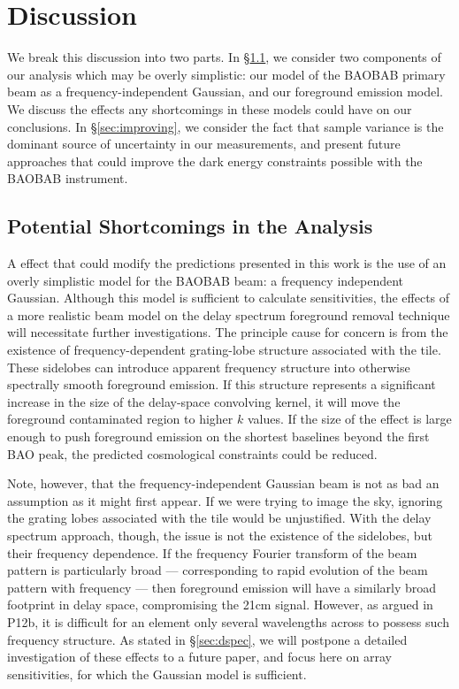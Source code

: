 \documentclass[10pt,iop]{emulateapj}
\begin{document}
\section{Discussion}
\label{sec:discussion}

We break this discussion into two parts.  In \S\ref{sec:shortcomings}, we consider two 
components of our analysis which may be overly simplistic: our model of the BAOBAB primary
beam as a frequency-independent Gaussian, and our foreground emission model.  We discuss the effects 
any shortcomings in these models could have on our conclusions. In \S\ref{sec:improving},
we consider the fact that sample variance is the dominant source of uncertainty in our
measurements, and present future approaches that could improve the dark energy constraints possible 
with the BAOBAB instrument.

\subsection{Potential Shortcomings in the Analysis}
\label{sec:shortcomings}
A effect that could modify the predictions presented in this
work is the use of an overly simplistic model for the BAOBAB beam: a frequency independent
Gaussian.  Although this model is sufficient to calculate sensitivities, the effects of
a more realistic beam model on the delay spectrum foreground removal technique will necessitate
further investigations.  The principle cause for concern is from the existence of frequency-dependent
grating-lobe structure associated with the tile.  These sidelobes can introduce apparent 
frequency structure into otherwise spectrally
smooth foreground emission.  If this structure represents a significant increase in the size
of the delay-space convolving kernel, it will move the foreground contaminated region to higher $k$ values.  If the size of the effect is
large enough to push foreground emission on the shortest baselines beyond the first BAO peak,
the predicted cosmological constraints could be reduced.

Note, however, that the frequency-independent Gaussian beam is not as bad an assumption as it
might first appear.  If we were trying to image the sky, ignoring the grating lobes associated with
the tile would be unjustified.  With the delay spectrum approach, though, the issue is not
the existence of the sidelobes, but their frequency dependence.  If the frequency Fourier transform
of the beam pattern is particularly broad --- corresponding to rapid evolution of the beam pattern
with frequency --- then foreground emission will have a similarly broad footprint in delay space,
compromising the 21cm signal.  However, as argued in P12b, it is difficult for an element
only several wavelengths across to possess such frequency structure.  As stated in \S\ref{sec:dspec},
we will postpone a detailed investigation of these effects to a future paper, and focus here
on array sensitivities, for which the Gaussian model is sufficient.
\end{document}
